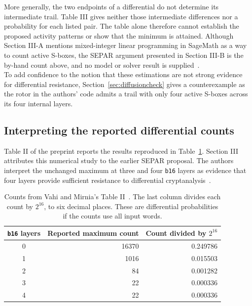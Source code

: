 \documentclass[11pt]{article}
\begin{document}
More generally, the two endpoints of a differential do not determine its
intermediate trail. Table III gives neither those intermediate differences
nor a probability for each listed pair. The table alone therefore cannot
establish the proposed activity patterns or show that the minimum is
attained. Although Section III-A mentions mixed-integer linear programming
in SageMath as a way to count active S-boxes, the SEPAR argument presented
in Section III-B is the by-hand count above, and no model
or solver result is supplied~\cite{separ-differential}.\\


To add confidence to the notion that these estimations are not strong evidence for differential resistance, Section~\ref{sec:diffusioncheck} gives a counterexample as the rotor in
the authors' code admits a trail with only four active S-boxes across
its four internal layers.\\



\subsection{Interpreting the reported differential counts}
Table II of the preprint reports the results reproduced in
Table~\ref{tab:prior-counts}. Section III attributes this numerical study
to the earlier SEPAR proposal. The authors interpret the unchanged maximum
at three and four \texttt{b16} layers as evidence that four layers provide
sufficient resistance to differential cryptanalysis~\cite{separ-differential}.

\begin{table}[h]
\centering
\begin{tabular}{crr}
\toprule
\texttt{b16} layers & Reported maximum count & Count divided by \(2^{16}\)\\
\midrule
0 & 16370 & 0.249786\\
1 & 1016  & 0.015503\\
2 & 84    & 0.001282\\
3 & 22    & 0.000336\\
4 & 22    & 0.000336\\
\bottomrule
\end{tabular}
\caption{Counts from Vahi and Mirnia's Table II~\cite{separ-differential}.
The last column divides each count by \(2^{16}\), to six decimal places.
These are differential probabilities if the counts use all input words.}
\label{tab:prior-counts}
\end{table}
\end{document}
